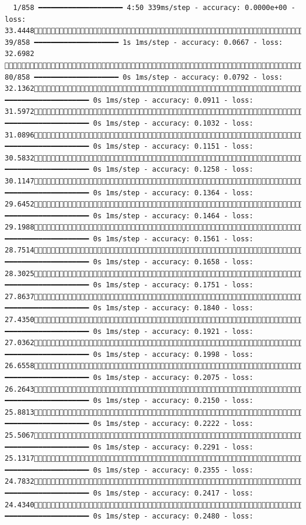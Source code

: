 \documentclass[
  letterpaper,
  DIV=11,
  numbers=noendperiod]{scrartcl}
\begin{document}
\begin{verbatim}
  1/858 ━━━━━━━━━━━━━━━━━━━━ 4:50 339ms/step - accuracy: 0.0000e+00 - loss: 33.4448 39/858 ━━━━━━━━━━━━━━━━━━━━ 1s 1ms/step - accuracy: 0.0667 - loss: 32.6982         80/858 ━━━━━━━━━━━━━━━━━━━━ 0s 1ms/step - accuracy: 0.0792 - loss: 32.1362121/858 ━━━━━━━━━━━━━━━━━━━━ 0s 1ms/step - accuracy: 0.0911 - loss: 31.5972161/858 ━━━━━━━━━━━━━━━━━━━━ 0s 1ms/step - accuracy: 0.1032 - loss: 31.0896202/858 ━━━━━━━━━━━━━━━━━━━━ 0s 1ms/step - accuracy: 0.1151 - loss: 30.5832241/858 ━━━━━━━━━━━━━━━━━━━━ 0s 1ms/step - accuracy: 0.1258 - loss: 30.1147281/858 ━━━━━━━━━━━━━━━━━━━━ 0s 1ms/step - accuracy: 0.1364 - loss: 29.6452320/858 ━━━━━━━━━━━━━━━━━━━━ 0s 1ms/step - accuracy: 0.1464 - loss: 29.1988360/858 ━━━━━━━━━━━━━━━━━━━━ 0s 1ms/step - accuracy: 0.1561 - loss: 28.7514401/858 ━━━━━━━━━━━━━━━━━━━━ 0s 1ms/step - accuracy: 0.1658 - loss: 28.3025442/858 ━━━━━━━━━━━━━━━━━━━━ 0s 1ms/step - accuracy: 0.1751 - loss: 27.8637483/858 ━━━━━━━━━━━━━━━━━━━━ 0s 1ms/step - accuracy: 0.1840 - loss: 27.4350522/858 ━━━━━━━━━━━━━━━━━━━━ 0s 1ms/step - accuracy: 0.1921 - loss: 27.0362560/858 ━━━━━━━━━━━━━━━━━━━━ 0s 1ms/step - accuracy: 0.1998 - loss: 26.6558600/858 ━━━━━━━━━━━━━━━━━━━━ 0s 1ms/step - accuracy: 0.2075 - loss: 26.2643640/858 ━━━━━━━━━━━━━━━━━━━━ 0s 1ms/step - accuracy: 0.2150 - loss: 25.8813680/858 ━━━━━━━━━━━━━━━━━━━━ 0s 1ms/step - accuracy: 0.2222 - loss: 25.5067721/858 ━━━━━━━━━━━━━━━━━━━━ 0s 1ms/step - accuracy: 0.2291 - loss: 25.1317760/858 ━━━━━━━━━━━━━━━━━━━━ 0s 1ms/step - accuracy: 0.2355 - loss: 24.7832800/858 ━━━━━━━━━━━━━━━━━━━━ 0s 1ms/step - accuracy: 0.2417 - loss: 24.4340841/858 ━━━━━━━━━━━━━━━━━━━━ 0s 1ms/step - accuracy: 0.2480 - loss: 
\end{verbatim}
\end{document}
